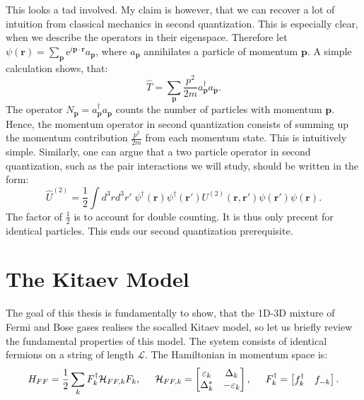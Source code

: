 This looks a tad involved. My claim is however, that we can recover a lot of intuition from classical mechanics in second quantization. This is especially clear, when we describe the operators in their eigenspace. Therefore let $\psi(\mathbf{r}) = \sum_{\mathbf{p}} \text{e}^{i\mathbf{p}\cdot \mathbf{r}} a_\mathbf{p}$, where $a_\mathbf{p}$ annihilates a particle of momentum $\mathbf{p}$. A simple calculation shows, that:
\begin{equation}
\hat{T} = \sum_\mathbf{p} \frac{p^2}{2m} a^\dagger_\mathbf{p}a_\mathbf{p}.
\end{equation}
The operator $N_\mathbf{p} = a^\dagger_\mathbf{p}a_\mathbf{p}$ counts the number of particles with momentum $\mathbf{p}$. Hence, the momentum operator in second quantization consists of summing up the momentum contribution $\frac{p^2}{2m}$ from each momentum state. This is intuitively simple. Similarly, one can argue that a two particle operator in second quantization, such as the pair interactions we will study, should be written in the form:
\begin{equation}
\hat{U}^{(2)} = \frac{1}{2}\int d^3 r d^3 r' \; \psi^\dagger(\mathbf{r}) \psi^\dagger(\mathbf{r}') U^{(2)}(\mathbf{r},\mathbf{r}')\psi(\mathbf{r}')\psi(\mathbf{r}). \nonumber 
\end{equation}
The factor of $\frac{1}{2}$ is to account for double counting. It is thus only precent for identical particles. This ends our second quantization prerequisite. 


\section{The Kitaev Model}
The goal of this thesis is fundamentally to show, that the 1D-3D mixture of Fermi and Bose gases realises the socalled Kitaev model, so let us briefly review the fundamental properties of this model. The system consists of identical fermions on a string of length $\mathcal{L}$. The Hamiltonian in momentum space is: 
\begin{equation}
H_{FF} = \frac{1}{2}\sum_{k} F_k^\dagger \mathcal{H}_{FF,k} F_k, \hspace{0.5cm} \mathcal{H}_{FF,k} = \begin{bmatrix} \varepsilon_k & \Delta_k \\ \Delta^*_k & -\varepsilon_k \end{bmatrix}, \hspace{0.5cm} F^\dagger_k = \begin{bmatrix} f_k^\dagger & f_{-k} \end{bmatrix}. 
\label{eq.HKitaevpre}
\end{equation}

